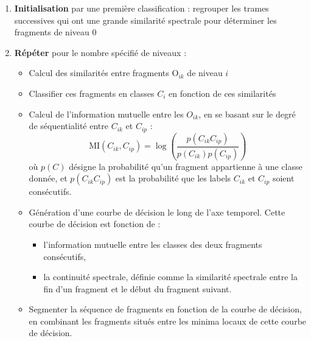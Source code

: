 \begin{enumerate}
  \item \textbf{Initialisation} par une première classification : regrouper les trames successives qui ont une grande similarité spectrale pour déterminer les fragments de niveau 0
  \item \textbf{Répéter} pour le nombre spécifié de niveaux :
  \begin{itemize}
    \item Calcul des similarités entre fragments $\text{O}_{i k}$ de niveau $i$
    \item Classifier ces fragments en classes $C_i$ en fonction de ces similarités
    \item Calcul de l'information mutuelle entre les $O_{i k}$, en se basant sur le degré de séquentialité entre $C_{i k}$ et $C_{i p}$ :
    \[ \mathrm{MI} \left( C_{i k}, C_{i p} \right) = \log \left(\frac{p\left(C_{i k} C_{i p}\right)}{p\left(C_{i k}\right)p\left(C_{i p}\right)}\right) \]
    où $p(C)$ désigne la probabilité qu'un fragment appartienne à une classe donnée, et $p(C_{i k} C_{i p})$ est la probabilité que les labels $C_{i k}$  et $C_{i p}$ soient consécutifs.
    \item Génération d'une courbe de décision le long de l'axe temporel. Cette courbe de décision est fonction de :
    \begin{itemize}
      \item l'information mutuelle entre les classes des deux fragments consécutifs,
      \item la continuité spectrale, définie comme la similarité spectrale entre la fin d'un fragment et le début du fragment suivant.
    \end{itemize}
    \item Segmenter la séquence de fragments en fonction de la courbe de décision, en combinant les fragments situés entre les minima locaux de cette courbe de décision.
  \end{itemize}
\end{enumerate}

